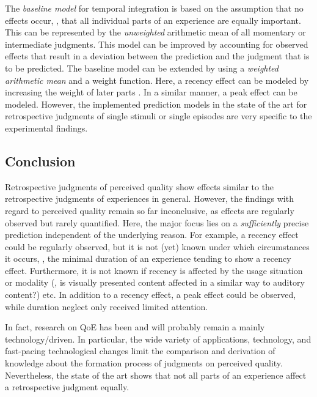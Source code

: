 The \emph{baseline model} for temporal integration is based on the assumption that no effects occur, \ie, that all individual parts of an experience are equally important.
This can be represented by the \emph{unweighted} arithmetic mean of all momentary or intermediate judgments.
This model can be improved by accounting for observed effects that result in a deviation between the prediction and the judgment that is to be predicted.
The baseline model can be extended by using a \emph{weighted arithmetic mean} and a weight function.
Here, a recency effect can be modeled by increasing the weight of later parts \citep[][]{rosenbluth_testing_1998, weiss_modeling_2009, hamberg_time-varying_1999}.
In a similar manner, a peak effect can be modeled.
However, the implemented prediction models in the state of the art for retrospective judgments of single stimuli or single episodes are very specific to the experimental findings.

\subsection{Conclusion}
Retrospective judgments of perceived quality show effects similar to the retrospective judgments of experiences in general.
However, the findings with regard to perceived quality remain so far inconclusive, as effects are regularly observed but rarely quantified.
Here, the major focus lies on a \emph{sufficiently} precise prediction independent of the underlying reason.
For example, a recency effect could be regularly observed, but it is not (yet) known under which circumstances it occurs, \eg, the minimal duration of an experience tending to show a recency effect.
Furthermore, it is not known if recency is affected by the usage situation or modality (\eg, is visually presented content affected in a similar way to auditory content?) etc.
In addition to a recency effect, a peak effect could be observed, while duration neglect only received limited attention.

In fact, research on \ac{QoE} has been and will probably remain a mainly technology\-/driven.
In particular, the wide variety of applications, technology, and fast-pacing technological changes limit the comparison and derivation of knowledge about the formation process of judgments on perceived quality.
Nevertheless, the state of the art shows that not all parts of an experience affect a retrospective judgment equally.
